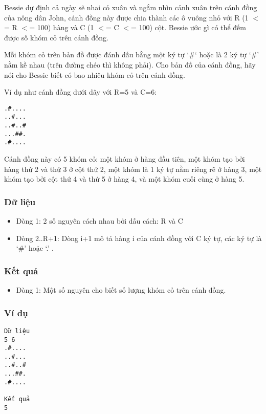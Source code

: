 



   Bessie dự định cả ngày sẽ nhai cỏ xuân và ngắm nhìn cảnh xuân trên  cánh đồng của nông dân John, cánh đồng này được chia thành các ô vuông nhỏ với R (1 $<$= R $<$= 100) hàng và C (1 $<$= C $<$= 100) cột. Bessie ước gì  có thể đếm được số khóm cỏ trên cánh đồng.  

   Mỗi khóm cỏ trên bản đồ được đánh dấu bằng một ký tự ‘\#‘ hoặc là 2 ký  tự ‘\#’ nằm kề nhau (trên đường chéo thì không phải). Cho bản đồ của  cánh đồng, hãy nói cho Bessie biết có bao nhiêu khóm cỏ trên  cánh đồng.  

   Ví dụ như cánh đồng dưới dây với R=5 và C=6:  
\begin{verbatim}
.#....
..#...
..#..#
...##.
.#....
\end{verbatim}

   Cánh đồng này có 5 khóm cỏ: một khóm ở hàng đầu tiên, một khóm tạo  bởi hàng thứ 2 và thứ 3 ở cột thứ 2, một khóm là 1 ký tự nằm riêng  rẽ ở hàng 3, một khóm tạo bởi cột thứ 4 và thứ 5 ở hàng 4, và một  khóm cuối cùng ở hàng 5.  

\subsubsection{   Dữ liệu  }
\begin{itemize}
	\item     Dòng 1: 2 số nguyên cách nhau bởi dấu cách: R và C   
	\item     Dòng 2..R+1: Dòng i+1 mô tả hàng i của cánh đồng với C         ký tự, các ký tự là ‘\#’ hoặc ‘.’ .   
\end{itemize}

\subsubsection{   Kết quả  }
\begin{itemize}
	\item     Dòng 1: Một số nguyên cho biết số lượng khóm cỏ trên cánh đồng.   
\end{itemize}

\subsubsection{   Ví dụ  }
\begin{verbatim}
Dữ liệu
5 6
.#....
..#...
..#..#
...##.
.#....

Kết quả
5
\end{verbatim}